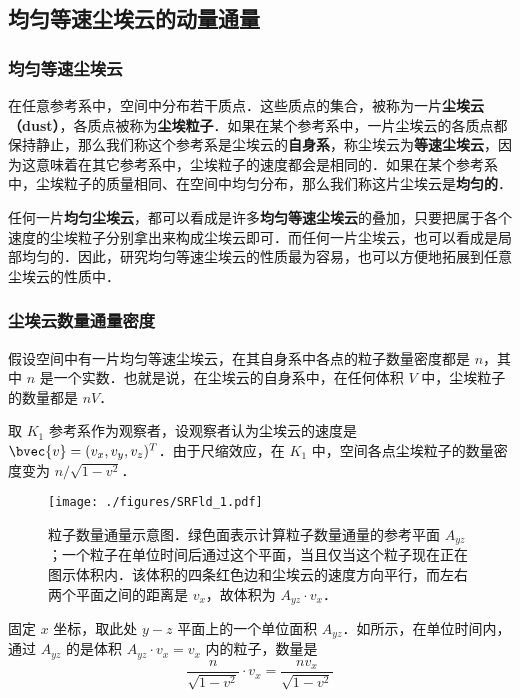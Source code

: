 



\subsection{均匀等速尘埃云的动量通量}

\subsubsection{均匀等速尘埃云}

在任意参考系中，空间中分布若干质点．这些质点的集合，被称为一片\textbf{尘埃云（dust）}，各质点被称为\textbf{尘埃粒子}．如果在某个参考系中，一片尘埃云的各质点都保持静止，那么我们称这个参考系是尘埃云的\textbf{自身系}，称尘埃云为\textbf{等速尘埃云}，因为这意味着在其它参考系中，尘埃粒子的速度都会是相同的．如果在某个参考系中，尘埃粒子的质量相同、在空间中均匀分布，那么我们称这片尘埃云是\textbf{均匀的}．

任何一片\textbf{均匀尘埃云}，都可以看成是许多\textbf{均匀等速尘埃云}的叠加，只要把属于各个速度的尘埃粒子分别拿出来构成尘埃云即可．而任何一片尘埃云，也可以看成是局部均匀的．因此，研究均匀等速尘埃云的性质最为容易，也可以方便地拓展到任意尘埃云的性质中．

\subsubsection{尘埃云数量通量密度}

假设空间中有一片均匀等速尘埃云，在其自身系中各点的粒子数量密度都是 $n$，其中 $n$ 是一个实数．也就是说，在尘埃云的自身系中，在任何体积 $V$ 中，尘埃粒子的数量都是 $nV$．

取 $K_1$ 参考系作为观察者，设观察者认为尘埃云的速度是 $\bvec{v}=(v_x, v_y, v_z)^T$．由于尺缩效应，在 $K_1$ 中，空间各点尘埃粒子的数量密度变为 $n/\sqrt{1-v^2}$．

\begin{figure}[ht]
\centering
\texttt{[image: ./figures/SRFld\_1.pdf]}
\caption{粒子数量通量示意图．绿色面表示计算粒子数量通量的参考平面 $A_{yz}$；一个粒子在单位时间后通过这个平面，当且仅当这个粒子现在正在图示体积内．该体积的四条红色边和尘埃云的速度方向平行，而左右两个平面之间的距离是 $v_x$，故体积为 $A_{yz}\cdot v_x$．} \label{SRFld_fig1}
\end{figure}

固定 $x$ 坐标，取此处 $y-z$ 平面上的一个单位面积 $A_{yz}$．如所示，在单位时间内，通过 $A_{yz}$ 的是体积 $A_{yz}\cdot v_x=v_x$ 内的粒子，数量是
\begin{equation}
\frac{n}{\sqrt{1-v^2}}\cdot v_x=\frac{nv_x}{\sqrt{1-v^2}}
\end{equation}

